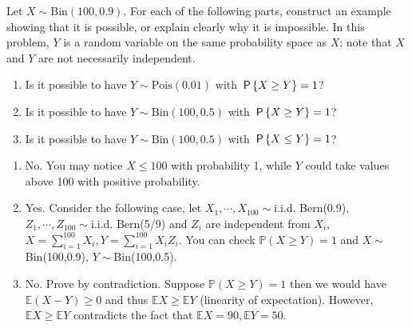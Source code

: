 
\setcounter{theorem}{19}
\begin{exercise} [BH.4.20] Let $X \sim \text{Bin}(100, 0.9)$. For each of the following parts, construct an example showing that it is possible, or explain clearly why it is impossible. In this problem, $Y$ is a random variable on the same probability space as $X$; note that $X$ and $Y$ are not necessarily independent.
	\begin{enumerate}
		\item Is it possible to have $Y \sim \text{Pois}(0.01)$ with $\P{X \geq Y} = 1$?
		\item Is it possible to have $Y \sim \text{Bin}(100,0.5)$ with $\P{X \geq Y} = 1$?
		\item Is it possible to have $Y \sim \text{Bin}(100,0.5)$ with $\P{X \leq Y} = 1$?
	\end{enumerate}
\begin{solution}
    \begin{enumerate}
        \item No. You may notice $X\leq 100$ with probability 1, while $Y$ could take values above 100 with positive probability.
        \item Yes. Consider the following case, let $X_1, \cdots, X_{100}\sim$i.i.d. Bern(0.9), $Z_1, \cdots, Z_{100}\sim$i.i.d. Bern(5/9) and $Z_i$ are independent from $X_i$,  $X=\sum_{i=1}^{100} X_i, Y=\sum_{i=1}^{100}X_iZ_i$. You can check $\mathbb{P}(X\geq Y)=1$ and $X\sim$Bin(100,0.9), $Y\sim$Bin(100,0.5).
        \item No. Prove by contradiction. Suppose $\mathbb{P}(X\geq Y) =1$ then we would have $\mathbb{E}(X-Y) \geq 0$ and thus 
        $\mathbb{E}X\geq \mathbb{E}Y$ (linearity of expectation). However, $\mathbb{E}X\geq \mathbb{E}Y$ contradicts the fact that $\mathbb{E}X=90, \mathbb{E}Y=50$.
    \end{enumerate}
\end{solution}
\end{exercise}

